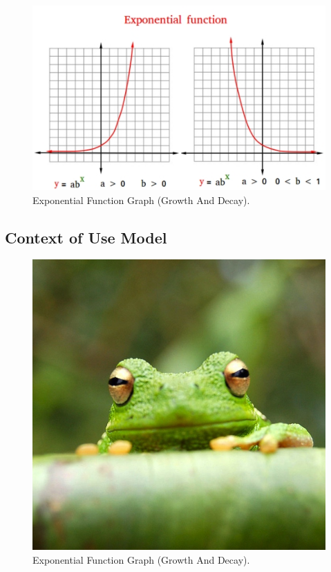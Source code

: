 \documentclass[12pt, a4paper]{article}
\begin{document}
\newpage

\begin{figure}[h]
  \includegraphics[width=\linewidth]{exponential-function.jpg}
  \caption{Exponential Function Graph (Growth And Decay).}
  \label{fig:exponential function graph (growth and decay)}
\end{figure}

\subsection{Context of Use Model}
\begin{figure}[h!]
  \includegraphics[width=0.5\linewidth]{frog.jpg}
  \caption{Exponential Function Graph (Growth And Decay).}
  \label{fig:exponential function graph (growth and decay)}
\end{figure}


\newpage
\end{document}
